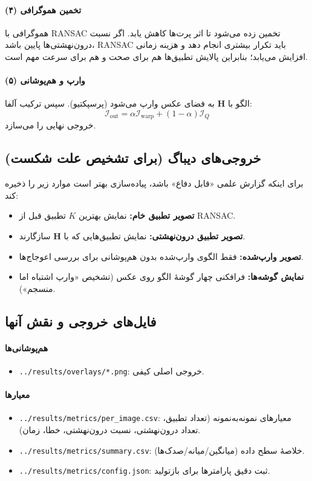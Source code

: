 \paragraph{(۴) تخمین هموگرافی}
هموگرافی با RANSAC \cite{FischlerBolles1981} تخمین زده می‌شود تا اثر پرت‌ها کاهش یابد. اگر نسبت درون‌نهشتی‌ها پایین باشد، RANSAC باید تکرار بیشتری انجام دهد و هزینه زمانی افزایش می‌یابد؛ بنابراین پالایش تطبیق‌ها هم برای صحت و هم برای سرعت مهم است.

\paragraph{(۵) وارپ و هم‌پوشانی}
الگو با $\mathbf{H}$ به فضای عکس وارپ می‌شود (پرسپکتیو). سپس ترکیب آلفا:
\[
\mathcal{I}_{\text{out}} = \alpha \mathcal{I}_{\text{warp}} + (1-\alpha)\mathcal{I}_Q
\]
خروجی نهایی را می‌سازد.

\subsection{خروجی‌های دیباگ (برای تشخیص علت شکست)}
برای اینکه گزارش علمی «قابل دفاع» باشد، پیاده‌سازی بهتر است موارد زیر را ذخیره کند:
\begin{itemize}
  \item \textbf{تصویر تطبیق خام:} نمایش بهترین $K$ تطبیق قبل از RANSAC.
  \item \textbf{تصویر تطبیق درون‌نهشتی:} نمایش تطبیق‌هایی که با $\mathbf{H}$ سازگارند.
  \item \textbf{تصویر وارپ‌شده:} فقط الگوی وارپ‌شده بدون هم‌پوشانی برای بررسی اعوجاج‌ها.
  \item \textbf{نمایش گوشه‌ها:} فرافکنی چهار گوشهٔ الگو روی عکس (تشخیص «وارپ اشتباه اما منسجم»).
\end{itemize}

\subsection{فایل‌های خروجی و نقش آنها}
\paragraph{هم‌پوشانی‌ها}
\begin{itemize}
  \item \texttt{../results/overlays/*.png}: خروجی اصلی کیفی.
\end{itemize}

\paragraph{معیارها}
\begin{itemize}
  \item \texttt{../results/metrics/per\_image.csv}: معیارهای نمونه‌به‌نمونه (تعداد تطبیق، تعداد درون‌نهشتی، نسبت درون‌نهشتی، خطا، زمان).
  \item \texttt{../results/metrics/summary.csv}: خلاصهٔ سطح داده (میانگین/میانه/صدک‌ها).
  \item \texttt{../results/metrics/config.json}: ثبت دقیق پارامترها برای بازتولید.
\end{itemize}

